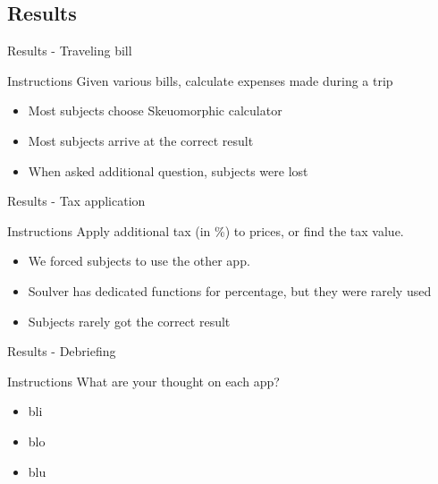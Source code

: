 \documentclass{beamer}
\begin{document}
\subsection{Results}

\begin{frame}{Results - Traveling bill}

    \begin{block}{Instructions}
        Given various bills, calculate expenses made during a trip
    \end{block}

    \begin{itemize}
        \item Most subjects choose Skeuomorphic calculator
        \item Most subjects arrive at the correct result
        \item When asked additional question, subjects were lost
    \end{itemize}

\end{frame}

\begin{frame}{Results - Tax application}

    \begin{block}{Instructions}
        Apply additional tax (in \%) to prices, or find the tax value.
    \end{block}

    \begin{itemize}
        \item We forced subjects to use the other app.
        \item Soulver has dedicated functions for percentage, but they were rarely used
        \item Subjects rarely got the correct result
    \end{itemize}

\end{frame}

\begin{frame}{Results - Debriefing}
    \begin{block}{Instructions}
        What are your thought on each app?
    \end{block}

    \begin{itemize}
        \item bli
        \item blo
        \item blu
    \end{itemize}
\end{frame}
\end{document}
